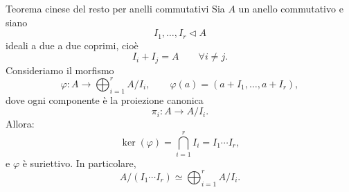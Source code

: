 \documentclass[a4paper]{article}
\begin{document}
\pagebreak

\begin{radioactive}
\begin{snippettheorem}{Teorema cinese del resto per anelli commutativi}
    Sia \(A\) un anello commutativo e siano
    \[
        I_1,\ldots,I_r \triangleleft A
    \]
    ideali a due a due coprimi, cioè
    \[
        I_i+I_j=A
        \qquad
        \forall i\neq j.
    \]
    Consideriamo il morfismo
    \[
        \varphi\colon A\to \bigoplus_{i=1}^r A/I_i,
        \qquad
        \varphi(a)=(a+I_1,\ldots,a+I_r),
    \]
    dove ogni componente è la proiezione canonica
    \[
        \pi_i\colon A\to A/I_i.
    \]
    Allora:
    \[
        \ker(\varphi)=\bigcap_{i=1}^r I_i=I_1\cdots I_r,
    \]
    e \(\varphi\) è suriettivo. In particolare,
    \[
        A/(I_1\cdots I_r)
        \simeq
        \bigoplus_{i=1}^r A/I_i.
    \]
\end{snippettheorem}
\end{radioactive}
\end{document}
